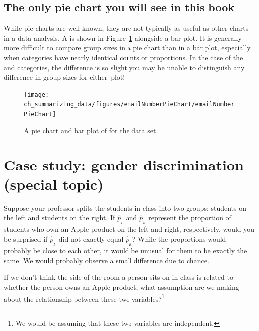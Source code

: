 \subsection{The only pie chart you will see in this book}

While pie charts are well known, they are not typically as useful as other charts in a data analysis. A  is shown in Figure~\ref{emailNumberPieChart} alongside a bar plot. It is generally more difficult to compare group sizes in a pie chart than in a bar plot, especially when categories have nearly identical counts or proportions. In the case of the  and  categories, the difference is so slight you may be unable to distinguish any difference in group sizes for either~plot!

\begin{figure}
   \centering
   \texttt{[image: ch\_summarizing\_data/figures/emailNumberPieChart/emailNumberPieChart]}
   \caption{A pie chart and bar plot of  for the  data set.}
   \label{emailNumberPieChart}
\end{figure}



\section[Case study: gender discrimination (special topic)]{Case study: gender discrimination (special topic) }
\label{caseStudyGenderDiscrimination}


\begin{example}{Suppose your professor splits the students in class into two groups: students on the left and students on the right. If $\hat{p}_{_L}$ and $\hat{p}_{_R}$ represent the proportion of students who own an Apple product on the left and right, respectively, would you be surprised if $\hat{p}_{_L}$ did not {exactly} equal $\hat{p}_{_R}$?}\label{classRightLeftSideApple}
While the proportions would probably be close to each other, it would be unusual for them to be exactly the same. We would probably observe a small difference due to {chance}.
\end{example}

\begin{exercise}
If we don't think the side of the room a person sits on in class is related to whether the person owns an Apple product, what assumption are we making about the relationship between these two variables?\footnote{We would be assuming that these two variables are independent.}
\end{exercise}

